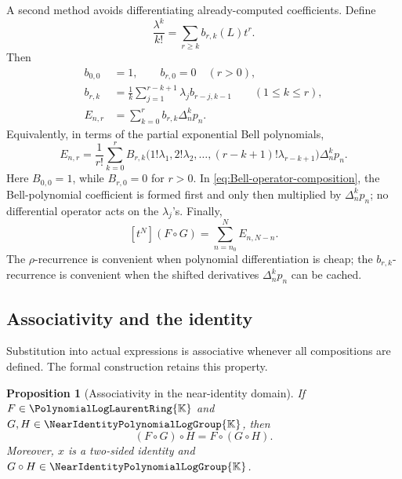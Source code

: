 \documentclass[11pt]{article}
\theoremstyle{pltheorem}
\newtheorem{proposition}[theorem]{Proposition}
\newcommand{\K}{\mathbb K}
\newcommand{\PLL}{\PolynomialLogLaurentRing{\K}}
\newcommand{\Gnear}{\NearIdentityPolynomialLogGroup{\K}}
\newcommand{\compose}{\mathbin{\circ}}
\begin{document}
A second method avoids differentiating already-computed coefficients.  Define
\begin{equation}\label{eq:b-r-k-def}
 \frac{\lambda^k}{k!}=\sum_{r\ge k}b_{r,k}(L)t^r.
\end{equation}
Then
\begin{align}
 b_{0,0}&=1,\qquad b_{r,0}=0\quad(r>0),\label{eq:b-boundary}\\
 b_{r,k}&=\frac1k\sum_{j=1}^{r-k+1}
 \lambda_jb_{r-j,k-1}
 \qquad(1\le k\le r),\label{eq:b-recurrence}\\
 E_{n,r}&=\sum_{k=0}^{r}b_{r,k}\Delta_n^kp_n.\label{eq:E-from-b}
\end{align}
Equivalently, in terms of the partial exponential Bell polynomials,
\begin{equation}\label{eq:Bell-operator-composition}
 E_{n,r}=\frac1{r!}\sum_{k=0}^{r}
 B_{r,k}\bigl(1!\lambda_1,2!\lambda_2,\ldots,
 (r-k+1)!\lambda_{r-k+1}\bigr)\Delta_n^kp_n.
\end{equation}
Here \(B_{0,0}=1\), while \(B_{r,0}=0\) for \(r>0\).
In \cref{eq:Bell-operator-composition}, the Bell-polynomial coefficient
is formed first and only then multiplied by \(\Delta_n^kp_n\); no
differential operator acts on the \(\lambda_j\)'s.  Finally,
\begin{equation}\label{eq:compose-from-E}
 [t^N](F\compose G)=\sum_{n=n_0}^{N}E_{n,N-n}.
\end{equation}
The \(\rho\)-recurrence is convenient when polynomial differentiation is
cheap; the \(b_{r,k}\)-recurrence is convenient when the shifted
derivatives \(\Delta_n^kp_n\) can be cached.

\subsection{Associativity and the identity}

Substitution into actual expressions is associative whenever all compositions are defined.  The formal construction retains this property.

\begin{proposition}[Associativity in the near-identity domain]\label{prop:composition-associative}
If \(F\in\PLL\) and \(G,H\in\Gnear\), then
\begin{equation}\label{eq:composition-assoc}
 (F\compose G)\compose H=F\compose(G\compose H).
\end{equation}
Moreover, \(x\) is a two-sided identity and \(G\compose H\in\Gnear\).
\end{proposition}
\end{document}
